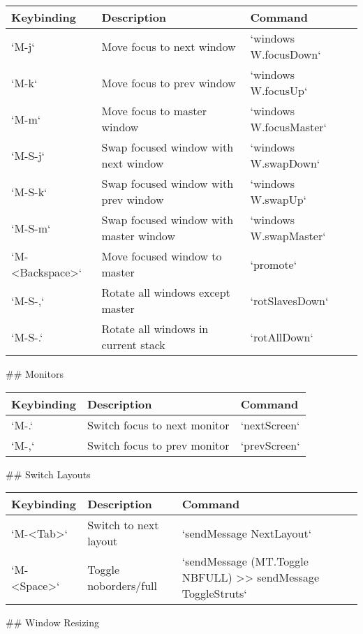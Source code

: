 \documentclass[11pt]{article}
\begin{document}
\begin{center}
\begin{tabular}{lll}
Keybinding & Description & Command\\
\hline
`M-j` & Move focus to next window & `windows W.focusDown`\\
`M-k` & Move focus to prev window & `windows W.focusUp`\\
`M-m` & Move focus to master window & `windows W.focusMaster`\\
`M-S-j` & Swap focused window with next window & `windows W.swapDown`\\
`M-S-k` & Swap focused window with prev window & `windows W.swapUp`\\
`M-S-m` & Swap focused window with master window & `windows W.swapMaster`\\
`M-<Backspace>` & Move focused window to master & `promote`\\
`M-S-,` & Rotate all windows except master & `rotSlavesDown`\\
`M-S-.` & Rotate all windows in current stack & `rotAllDown`\\
\end{tabular}
\end{center}

\#\# Monitors

\begin{center}
\begin{tabular}{lll}
Keybinding & Description & Command\\
\hline
`M-.` & Switch focus to next monitor & `nextScreen`\\
`M-,` & Switch focus to prev monitor & `prevScreen`\\
\end{tabular}
\end{center}

\#\# Switch Layouts

\begin{center}
\begin{tabular}{lll}
Keybinding & Description & Command\\
\hline
`M-<Tab>` & Switch to next layout & `sendMessage NextLayout`\\
`M-<Space>` & Toggle noborders/full & `sendMessage (MT.Toggle NBFULL) >> sendMessage ToggleStruts`\\
\end{tabular}
\end{center}

\#\# Window Resizing
\end{document}
